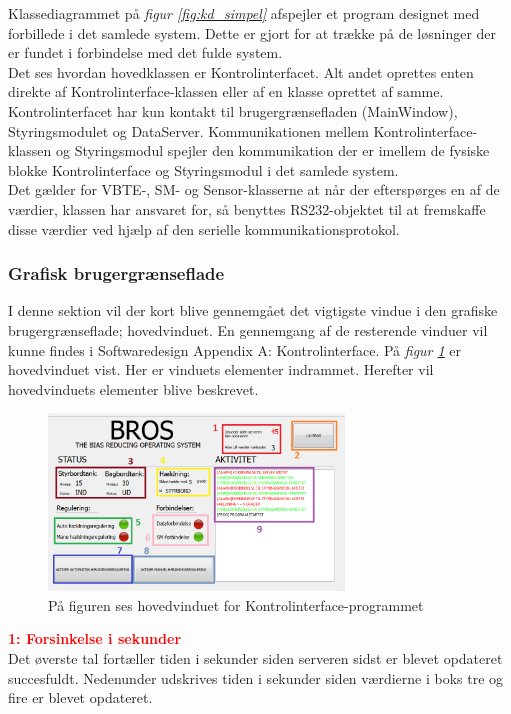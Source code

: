 Klassediagrammet på \textit{figur \ref{fig:kd_simpel}} afspejler et program designet med forbillede i det samlede system. Dette er gjort for at trække på de løsninger der er fundet i forbindelse med det fulde system. \\
Det ses hvordan hovedklassen er Kontrolinterfacet. Alt andet oprettes enten direkte af Kontrolinterface-klassen eller af en klasse oprettet af samme. Kontrolinterfacet har kun kontakt til brugergrænsefladen (MainWindow), Styringsmodulet og DataServer. Kommunikationen mellem Kontrolinterface-klassen og Styringsmodul spejler den kommunikation der er imellem de fysiske blokke Kontrolinterface og Styringsmodul i det samlede system.\\

Det gælder for VBTE-, SM- og Sensor-klasserne at når der efterspørges en af de værdier, klassen har ansvaret for, så benyttes RS232-objektet til at fremskaffe disse værdier ved hjælp af den serielle kommunikationsprotokol. 


\subsubsection{Grafisk brugergrænseflade}
I denne sektion vil der kort blive gennemgået det vigtigste vindue i den grafiske brugergrænseflade; hovedvinduet. En gennemgang af de resterende vinduer vil kunne findes i Softwaredesign Appendix A: Kontrolinterface.
På \textit{figur \ref{fig:hovedvindue}} er hovedvinduet vist. Her er vinduets elementer indrammet. Herefter vil hovedvinduets elementer blive beskrevet.

\begin{figure}[H]
\centering
\includegraphics[width=0.7\textwidth]{billeder/KI/hovedvindue}
\caption{På figuren ses hovedvinduet for Kontrolinterface-programmet}
\label{fig:hovedvindue}
\end{figure}

\textcolor{red}{\textbf{1: Forsinkelse i sekunder}}\\
Det øverste tal fortæller tiden i sekunder siden serveren sidst er blevet opdateret succesfuldt.
Nedenunder udskrives tiden i sekunder siden værdierne i boks tre og fire er blevet opdateret.

